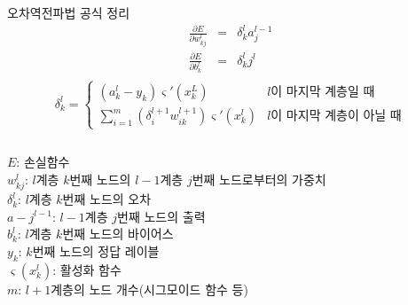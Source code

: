 \documentclass[10pt,t]{beamer}
\begin{document}
\begin{frame} {오차역전파법 공식 정리}
    \begin{eqnarray*}
        \frac{\partial E}{\partial w_{kj}^l} &=& \delta_k^l a_j^{l-1} \\
        \frac{\partial E}{\partial b_k^l} &=& \delta_k^l j^{l} \\
    \end{eqnarray*}
    \[
        \delta_k^l = 
       \begin{cases}
        (a_k^l - y_k)\varsigma'(x_k^L) & l \text{이 마지막 계층일 때}\\
        \sum_{i=1}^m (\delta_i^{l+1}w_{ik}^{l+1})\varsigma'(x_k^l) & l \text{이 마지막 계층이 아닐 때}
     \end{cases}
    \]
    {\footnotesize
    \begin{columns}
        $E$: 손실함수\\
        $w_{kj}^l$: $l$계층 $k$번째 노드의 $l-1$계층 $j$번째 노드로부터의 가중치\\
        $\delta_k^l$: $l$계층 $k$번째 노드의 오차\\
        $a-j^{l-1}$: $l-1$계층 $j$번째 노드의 출력\\
        $b_k^l$: $l$계층 $k$번째 노드의 바이어스\\
        $y_k$: $k$번째 노드의 정답 레이블\\
        $\varsigma(x_k^l)$: 활성화 함수\\
        $m$: $l+1$계층의 노드 개수(시그모이드 함수 등)
    \end{columns}
    }
\end{frame}
\end{document}

